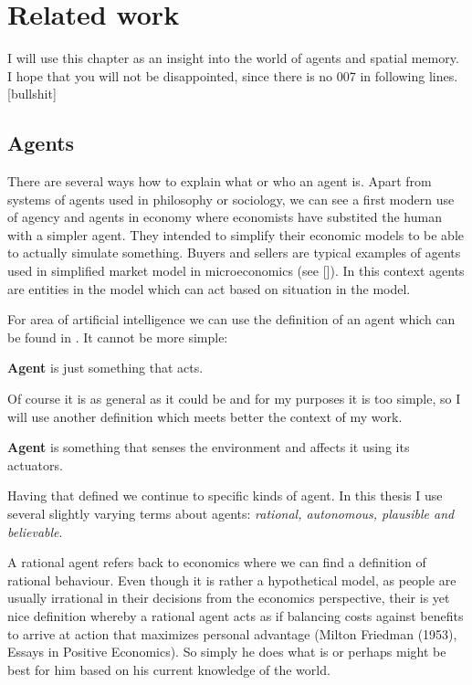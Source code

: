 \chapter{Related work}

I will use this chapter as an insight into the world of agents and spatial memory. I hope that you will not be disappointed, since there is no 007 in following lines. [bullshit]

\section{Agents}

There are several ways how to explain what or who an agent is. Apart from systems of agents used in philosophy or sociology, we can see a first modern use of agency and agents in economy where economists have substited the human with a simpler agent. They intended to simplify their economic models to be able to actually simulate something. Buyers and sellers are typical examples of agents used in simplified market model in microeconomics (see []). In this context agents are entities in the model which can act based on situation in the model.

For area of artificial intelligence we can use the definition of an agent which can be found in \cite{russel2003ai}. It cannot be more simple:

\begin{definition}{\bf Agent} is just something that acts.
\end{definition} 

Of course it is as general as it could be and for my purposes it is too simple, so I will use another definition which meets better the context of my work.

\begin{definition}{\bf Agent} is something that senses the environment and affects it using its actuators.
\end{definition} 

Having that defined we continue to specific kinds of agent. In this thesis I use several slightly varying terms about agents: \emph{rational, autonomous, plausible and believable}. 

A rational agent refers back to economics where we can find a definition of rational behaviour. Even though it is rather a hypothetical model, as people are usually irrational in their decisions from the economics perspective, their is yet nice definition whereby a rational agent acts as if balancing costs against benefits to arrive at action that maximizes personal advantage (Milton Friedman (1953), Essays in Positive Economics). So simply he does what is or perhaps might be best for him based on his current knowledge of the world.
 

